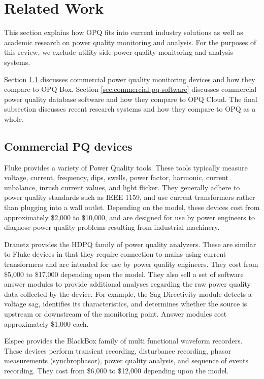 \section{Related Work}
\label{sec:related-work}

This section explains how OPQ fits into current industry solutions as well as academic research on power quality monitoring and analysis. For the purposes of this review, we exclude utility-side power quality monitoring and analysis systems.

Section \ref{sec:commercial-pq-devices} discusses commercial power quality monitoring devices and how they compare to OPQ Box. Section \ref{sec:commercial-pq-software} discusses commercial power quality database software and how they compare to OPQ Cloud. The final subsection discusses recent research systems and how they compare to OPQ as a whole.

\subsection{Commercial PQ devices}
\label{sec:commercial-pq-devices}

Fluke \cite{fluke_fluke_2020} provides a variety of Power Quality tools. These tools typically measure voltage, current, frequency, dips, swells, power factor, harmonic, current unbalance, inrush current values, and light flicker. They generally adhere to power quality standards such as IEEE 1159, and use current transformers rather than plugging into a wall outlet. Depending on the model, these devices cost from approximately \$2,000 to \$10,000, and are designed for use by power engineers to diagnose power quality problems resulting from industrial machinery.

Dranetz \cite{dranetz_dranetz_2020} provides the HDPQ family of power quality analyzers. These are similar to Fluke devices in that they require connection to mains using current transformers and are intended for use by power quality engineers. They cost from \$5,000 to \$17,000 depending upon the model. They also sell a set of software answer modules to provide additional analyses regarding the raw power quality data collected by the device. For example, the Sag Directivity module detects a voltage sag, identifies its characteristics, and determines whether the source is upstream or downstream of the monitoring point. Answer modules cost approximately \$1,000 each.

Elspec \cite{elspec_elspec_2020} provides the BlackBox family of multi functional waveform recorders. These devices perform transient recording, disturbance recording, phasor measurements (synchrophasor), power quality analysis, and sequence of events recording. They cost from \$6,000 to \$12,000 depending upon the model.

